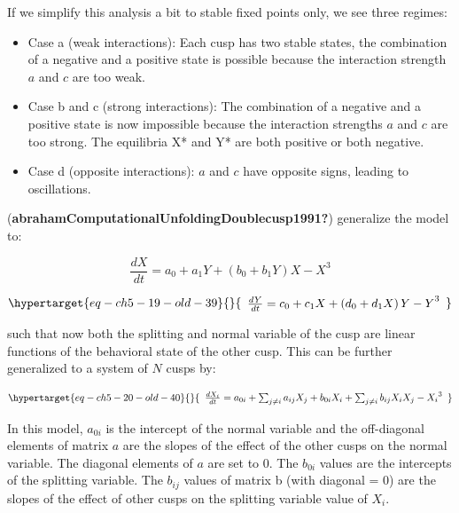 \documentclass[
  letterpaper,
]{scrbook}
\begin{document}
If we simplify this analysis a bit to stable fixed points only, we see
three regimes:

\begin{itemize}
\item
  Case a (weak interactions): Each cusp has two stable states, the
  combination of a negative and a positive state is possible because the
  interaction strength \(a\) and \(c\) are too weak.
\item
  Case b and c (strong interactions): The combination of a negative and
  a positive state is now impossible because the interaction strengths
  \(a\) and \(c\) are too strong. The equilibria X* and Y* are both
  positive or both negative.
\item
  Case d (opposite interactions): \(a\) and \(c\) have opposite signs,
  leading to oscillations.
\end{itemize}

(\textbf{abrahamComputationalUnfoldingDoublecusp1991?}) generalize the
model to:

\[\frac{dX}{dt} = {a_{0} + a_{1}Y + (b_{0} + b_{1}Y)X - X}^{3}\]

\begin{equation}\protect\hypertarget{eq-ch5-19-old-39}{}{\begin{array}{r}
\frac{dY}{dt} = {c_{0} + c_{1}X + \left( d_{0} + d_{1}X \right)Y - Y}^{3}
\end{array}}\label{eq-ch5-19-old-39}\end{equation}

such that now both the splitting and normal variable of the cusp are
linear functions of the behavioral state of the other cusp. This can be
further generalized to a system of \(N\) cusps by:

\begin{equation}\protect\hypertarget{eq-ch5-20-old-40}{}{\begin{array}{r}
\frac{dX_{i}}{dt} = a_{0i} + \sum_{j \neq i}^{}{a_{ij}X_{j}} + b_{0i}X_{i} + \sum_{j \neq i}^{}{b_{ij}X_{i}X_{j}} - {X_{i}}^{3}
\end{array}}\label{eq-ch5-20-old-40}\end{equation}

In this model, \(a_{0i}\) is the intercept of the normal variable and
the off-diagonal elements of matrix \(a\) are the slopes of the effect
of the other cusps on the normal variable. The diagonal elements of
\(a\) are set to 0. The \(b_{0i}\) values are the intercepts of the
splitting variable. The \(b_{ij}\) values of matrix b (with diagonal =
0) are the slopes of the effect of other cusps on the splitting variable
value of \(X_{i}\).
\end{document}
